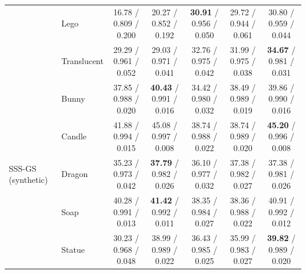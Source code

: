 \begin{table}[t]
\begin{tabular}{@{}llccccc@{}}
 & Lego & 16.78 / 0.809 / 0.200 & 20.27 / 0.852 / 0.192 & \textbf{30.91} / 0.956 / 0.050 & 29.72 / 0.944 / 0.061 & 30.80 / 0.959 / 0.044 \\
 & Translucent & 29.29 / 0.961 / 0.052 & 29.03 / 0.971 / 0.041 & 32.76 / 0.975 / 0.042 & 31.99 / 0.975 / 0.038 & \textbf{34.67} / 0.981 / 0.031 \\
\midrule
\multirow{5}{*}{SSS-GS (synthetic)} & Bunny & 37.85 / 0.988 / 0.020 & \textbf{40.43} / 0.991 / 0.016 & 34.42 / 0.980 / 0.032 & 38.49 / 0.989 / 0.019 & 39.86 / 0.990 / 0.016 \\
 & Candle & 41.88 / 0.994 / 0.015 & 45.08 / 0.997 / 0.008 & 38.74 / 0.988 / 0.022 & 38.74 / 0.989 / 0.020 & \textbf{45.20} / 0.996 / 0.008 \\
 & Dragon & 35.23 / 0.973 / 0.042 & \textbf{37.79} / 0.982 / 0.026 & 36.10 / 0.977 / 0.032 & 37.38 / 0.982 / 0.027 & 37.38 / 0.981 / 0.026 \\
 & Soap & 40.28 / 0.991 / 0.013 & \textbf{41.42} / 0.992 / 0.011 & 38.35 / 0.984 / 0.027 & 38.36 / 0.988 / 0.022 & 40.91 / 0.992 / 0.012 \\
 & Statue & 30.23 / 0.968 / 0.048 & 38.99 / 0.989 / 0.022 & 36.43 / 0.985 / 0.025 & 35.99 / 0.983 / 0.027 & \textbf{39.82} / 0.989 / 0.020 \\
\bottomrule
\end{tabular}
\end{table}

